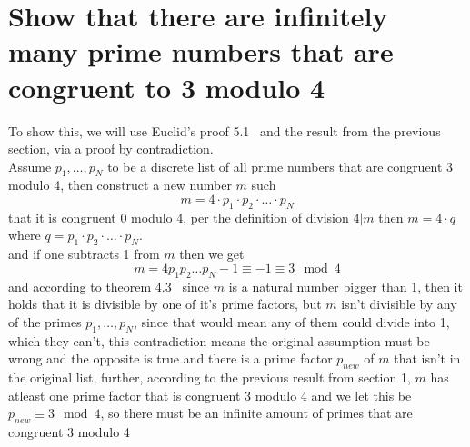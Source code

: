 \documentclass[12pt]{article}
\begin{document}
\section{Show that there are infinitely many prime numbers that are congruent to 3 modulo 4}
To show this, we will use Euclid's proof 5.1~\cite{Algebra} and the result from the previous section, via a proof by contradiction.\\
\newline
Assume $p_1, \hdots , p_N$ to be a discrete list of all prime numbers that are congruent 3 modulo 4, then construct a new number $m$ such
\[
m = 4\cdot p_1 \cdot p_2 \cdot \hdots \cdot p_N
\]
that it is congruent 0 modulo 4, per the definition of division $4|m$ then $m = 4 \cdot q$ where $q = p_1 \cdot p_2 \cdot \hdots \cdot p_N$.\\
and if one subtracts 1 from $m$ then we get
\[
m = 4p_1p_2 \hdots p_N - 1 \equiv -1 \equiv 3 \mod 4
\]
and according to theorem 4.3~\cite{Algebra} since $m$ is a natural number bigger than 1, then it holds that it is divisible by one of it's prime factors, 
but $m$ isn't divisible by any of the primes $p_1, \hdots, p_N$, since that would mean any of them could divide into 1, which they can't, this contradiction means the original assumption must be wrong and the opposite is true and there is a prime factor $p_{new}$
 of $m$ that isn't in the original list, further, according to the previous result from section 1, $m$ has atleast one prime factor that is congruent 3 modulo 4 and we let this be  $p_{new} \equiv 3 \mod 4$, so there must be an infinite amount of primes that are congruent 3 modulo 4 
\printbibliography
\end{document}
